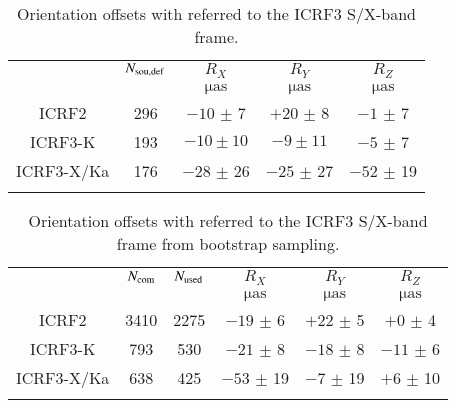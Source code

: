 \documentclass{aa-note}    %
\begin{document}
    \begin{table}
        \centering
        \caption{
        Orientation offsets with referred to the ICRF3 S/X-band frame.
        }
        \begin{tabular}{ccccc}
            \hline \noalign{\smallskip}
            & $N_{\rm sou,def}$ & $R_X$ & $R_Y$ & $R_Z$  \\
            &  &$\mathrm{\mu as}$ & $\mathrm{\mu as}$ & $\mathrm{\mu as}$  \\
            \noalign{\smallskip}
            \hline
            \noalign{\smallskip}
            ICRF2       & 296  & $ -10$  $\pm$ 7 & $ +20$  $\pm$  8 & $  -1$  $\pm$  7 \\
            ICRF3-K     & 193  & $ -10 \pm 10$   & $ -9 \pm  11$ & $ -5$  $\pm$  7 \\
            ICRF3-X/Ka  & 176  & $ -28$  $\pm$ 26 & $ -25$  $\pm$ 27 & $  -52$  $\pm$ 19 \\
            \noalign{\smallskip}
            \hline
        \end{tabular}
    \end{table}

    \begin{table}
        \centering
        \caption{
        Orientation offsets with referred to the ICRF3 S/X-band frame from bootstrap sampling.
        }
        \begin{tabular}{cccccc}
            \hline \noalign{\smallskip}
            & $N_{\rm com}$ & $N_{\rm used}$ & $R_X$ & $R_Y$ & $R_Z$  \\
            &  &  & $\mathrm{\mu as}$ & $\mathrm{\mu as}$ & $\mathrm{\mu as}$  \\
            \noalign{\smallskip}
            \hline
            \noalign{\smallskip}
            ICRF2       & 3410 & 2275 & $ -19$  $\pm$  6 & $ +22$  $\pm$  5 & $  +0$  $\pm$  4 \\
            ICRF3-K     & 793  & 530  & $ -21$  $\pm$  8 & $ -18$  $\pm$  8 & $ -11$  $\pm$  6 \\
            ICRF3-X/Ka  & 638  & 425  & $ -53$  $\pm$ 19 & $  -7$  $\pm$ 19 & $  +6$  $\pm$ 10 \\
            \noalign{\smallskip}
            \hline
        \end{tabular}
    \end{table}
\end{document}
